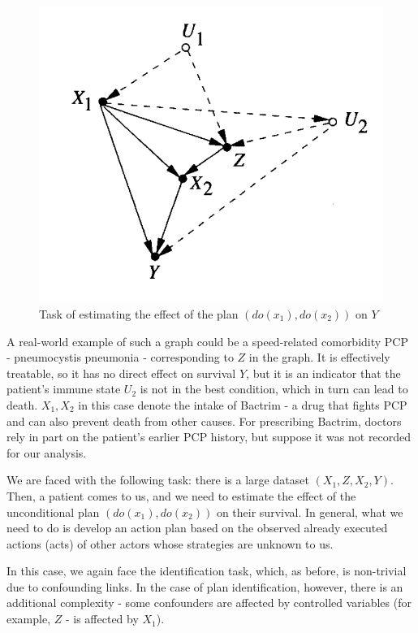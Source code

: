 \documentclass[fleqn]{article}
\numberwithin{equation}{section}
\numberwithin{theorem}{section}
\numberwithin{figure}{section}
\numberwithin{lemma}{section}
\numberwithin{corollary}{section}
\begin{document}
\begin{figure}[h]
	\begin{center}
		\includegraphics[scale=0.6]{imgs/img26.png}
	\end{center}
	\caption{Task of estimating the effect of the plan $(do(x_1), do(x_2))$ on $Y$}
	\label{fig:dynamic_plan}
\end{figure}

A real-world example of such a graph could be a speed-related comorbidity PCP - pneumocystis pneumonia - corresponding to $Z$ in the graph. It is effectively treatable, so it has no direct effect on survival $Y$, but it is an indicator that the patient's immune state $U_2$ is not in the best condition, which in turn can lead to death. $X_1, X_2$ in this case denote the intake of Bactrim - a drug that fights PCP and can also prevent death from other causes. For prescribing Bactrim, doctors rely in part on the patient's earlier PCP history, but suppose it was not recorded for our analysis.

We are faced with the following task: there is a large dataset $(X_1, Z, X_2, Y)$. Then, a patient comes to us, and we need to estimate the effect of the unconditional plan $(do(x_1), do(x_2))$ on their survival. In general, what we need to do is develop an action plan based on the observed already executed actions (acts) of other actors whose strategies are unknown to us.

In this case, we again face the identification task, which, as before, is non-trivial due to confounding links. In the case of plan identification, however, there is an additional complexity - some confounders are affected by controlled variables (for example, $Z$ - is affected by $X_1$).
\end{document}
